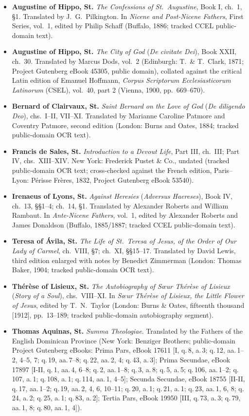 \begin{itemize}
\item \textbf{Augustine of Hippo, St.} \emph{The Confessions of St.\ Augustine}, Book I, ch.\ 1, \S 1. Translated by J.\ G.\ Pilkington. In \emph{Nicene and Post-Nicene Fathers}, First Series, vol.\ 1, edited by Philip Schaff (Buffalo, 1886; tracked CCEL public-domain text).
\item \textbf{Augustine of Hippo, St.} \emph{The City of God} (\emph{De civitate Dei}), Book XXII, ch.\ 30. Translated by Marcus Dods, vol.\ 2 (Edinburgh: T.\ \& T.\ Clark, 1871; Project Gutenberg eBook 45305, public domain), collated against the critical Latin edition of Emanuel Hoffmann, \emph{Corpus Scriptorum Ecclesiasticorum Latinorum} (CSEL), vol.\ 40, part 2 (Vienna, 1900, pp.\ 669--670).
\item \textbf{Bernard of Clairvaux, St.} \emph{Saint Bernard on the Love of God} (\emph{De diligendo Deo}), chs.\ I--II, VII--XI. Translated by Marianne Caroline Patmore and Coventry Patmore, second edition (London: Burns and Oates, 1884; tracked public-domain OCR text).
\item \textbf{Francis de Sales, St.} \emph{Introduction to a Devout Life}, Part III, ch.\ III; Part IV, chs.\ XIII--XIV. New York: Frederick Pustet \& Co., undated (tracked public-domain OCR text; cross-checked against the French edition, Paris--Lyon: P\'erisse Fr\`eres, 1832, Project Gutenberg eBook 53540).
\item \textbf{Irenaeus of Lyons, St.} \emph{Against Heresies} (\emph{Adversus Haereses}), Book IV, ch.\ 13, \S\S 1--4; ch.\ 14, \S 1. Translated by Alexander Roberts and William Rambaut. In \emph{Ante-Nicene Fathers}, vol.\ 1, edited by Alexander Roberts and James Donaldson (Buffalo, 1885/1887; tracked CCEL public-domain text).
\item \textbf{Teresa of Ávila, St.} \emph{The Life of St.\ Teresa of Jesus, of the Order of Our Lady of Carmel}, ch.\ VIII, \S 7; ch.\ XI, \S\S 15--17. Translated by David Lewis, third edition enlarged with notes by Benedict Zimmerman (London: Thomas Baker, 1904; tracked public-domain OCR text).
\item \textbf{Th\'er\`ese of Lisieux, St.} \emph{The Autobiography of S\oe ur Th\'er\`ese of Lisieux} (\emph{Story of a Soul}), chs.\ VIII--XI. In \emph{S\oe ur Th\'er\`ese of Lisieux, the Little Flower of Jesus}, edited by T.\ N.\ Taylor (London: Burns \& Oates, fifteenth thousand [1912], pp.\ 13--189; tracked public-domain autobiography segment).
\item \textbf{Thomas Aquinas, St.} \emph{Summa Theologiae}. Translated by the Fathers of the English Dominican Province (New York: Benziger Brothers; public-domain Project Gutenberg eBooks: Prima Pars, eBook 17611 [I, q.\,8, a.\,3; q.\,12, aa.\,1--2, 4--5, 7; q.\,19, aa.\,7--8; q.\,22, aa.\,2, 4; q.\,43, a.\,3]; Prima Secundae, eBook 17897 [I-II, q.\,1, aa.\,4, 6--8; q.\,2, aa.\,1--8; q.\,3, a.\,8; q.\,5, a.\,5; q.\,106, aa.\,1--2; q.\,107, a.\,1; q.\,108, a.\,1; q.\,114, aa.\,1, 4--5]; Secunda Secundae, eBook 18755 [II-II, q.\,17, aa.\,1--2; q.\,19, aa.\,2, 4, 6, 10--11; q.\,20, a.\,1; q.\,21, a.\,1; q.\,23, aa.\,1, 6, 8; q.\,24, a.\,2; q.\,25, a.\,1; q.\,83, a.\,2]; Tertia Pars, eBook 19950 [III, q.\,73, a.\,3; q.\,79, aa.\,1, 8; q.\,80, aa.\,1, 4]).
\end{itemize}
